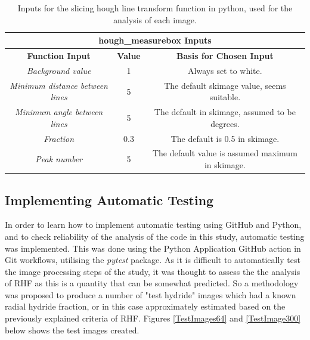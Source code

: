 \documentclass{article}
\begin{document}
\begin{table}[h]
	\begin{center}
	\begin{tabular}{ |c|c|c| } 
		\hline
		\multicolumn{3}{|c|}{\textbf{hough\_measurebox Inputs}} \\
		\hline
		\textbf{Function Input} & \textbf{Value} & \textbf{Basis for Chosen Input} \\
		\hline
		\textit{Background value} & 1 & Always set to white. \\
		\hline
		\textit{Minimum distance between lines} & 5 & The default skimage value, seems suitable. \\ 
		\hline
		\textit{Minimum angle between lines} & 5 & The default in skimage, assumed to be degrees. \\
		\hline
		\textit{Fraction} & 0.3 & The default is 0.5 in skimage. \\ 
		\hline
		\textit{Peak number} & 5 & The default value is assumed maximum in skimage. \\ 
		\hline
	\end{tabular}
	\caption{Inputs for the slicing hough line transform function in python, used for the analysis of each image.}
	\label{HoughmeasureboxInputs}
	\end{center}
\end{table}

\subsection{Implementing Automatic Testing}
In order to learn how to implement automatic testing using GitHub and Python, and to check reliability of the analysis of the code in this study, automatic testing was implemented. This was done using the Python Application GitHub action in Git workflows, utilising the \textit{pytest} package. As it is difficult to automatically test the image processing steps of the study, it was thought to assess the the analysis of RHF as this is a quantity that can be somewhat predicted. So a methodology was proposed to produce a number of "test hydride" images which had a known radial hydride fraction, or in this case approximately estimated based on the previously explained criteria of RHF. Figures \ref{TestImages64} and \ref{TestImage300} below shows the test images created.
\end{document}
